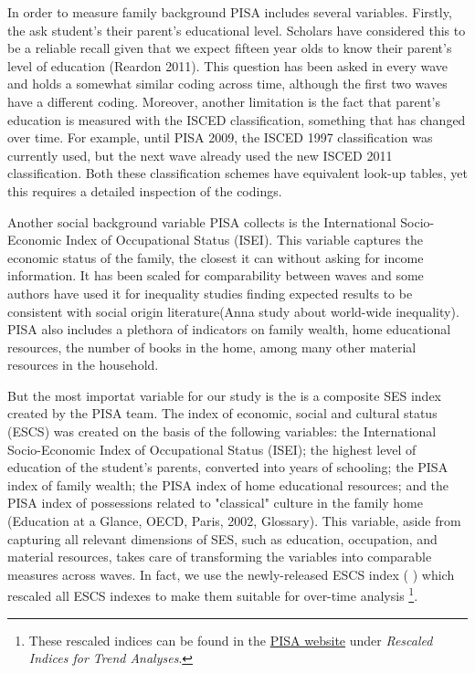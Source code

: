 \documentclass[11pt, a4paper]{article}\usepackage[]{graphicx}\usepackage[]{color}
\begin{document}
In order to measure family background PISA includes several variables. Firstly, the ask student's their parent's educational level. Scholars have considered this to be a reliable recall given that we expect fifteen year olds to know their parent's level of education (Reardon 2011). This question has been asked in every wave and holds a somewhat similar coding across time, although the first two waves have a different coding. Moreover, another limitation is the fact that parent's education is measured with the ISCED classification, something that has changed over time. For example, until PISA 2009, the ISCED 1997 classification was currently used, but the next wave already used the new ISCED 2011 classification. Both these classification schemes have equivalent look-up tables, yet this requires a detailed inspection of the codings.

Another social background variable PISA collects is the International Socio-Economic Index of Occupational Status (ISEI). This variable captures the economic status of the family, the closest it can without asking for income information. It has been scaled for comparability between waves and some authors have used it for inequality studies finding expected results to be consistent with social origin literature(Anna study about world-wide inequality). PISA also includes a plethora of indicators on family wealth, home educational resources, the number of books in the home, among many other material resources in the household.

But the most importat variable for our study is the is a composite SES index created by the PISA team. The index of economic, social and cultural status (ESCS) was created on the basis of the following variables: the International Socio-Economic Index of Occupational Status (ISEI); the highest level of education of the student’s parents, converted into years of schooling; the PISA index of family wealth; the PISA index of home educational resources; and the PISA index of possessions related to "classical" culture in the family home (Education at a Glance, OECD, Paris, 2002, Glossary). This variable, aside from capturing all relevant dimensions of SES, such as education, occupation, and material resources, takes care of transforming the variables into comparable measures across waves. In fact, we use the newly-released ESCS index (%
) which rescaled all ESCS indexes to make them suitable for over-time analysis \footnote{These rescaled indices can be found in the \href{http://www.oecd.org/pisa/data/2015database/}{PISA website} under \emph{Rescaled Indices for Trend Analyses}.}.
\end{document}

